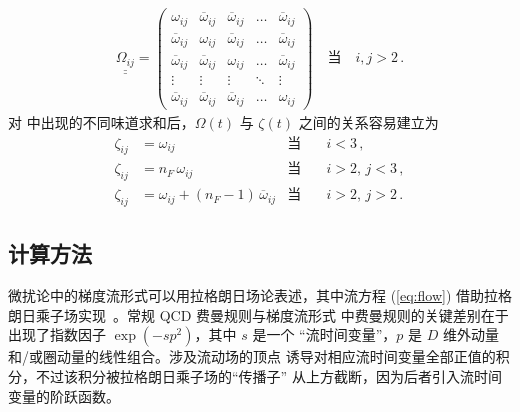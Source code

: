 \begin{equation}
	\begin{split}
		\underline{\underline{\Omega_{i j}}} =
		\begin{pmatrix}
			\omega_{i j} & \overline{\omega}_{i j} &
                        \overline{\omega}_{i j} & \dots &
                        \overline{\omega}_{i j} \\
			\overline{\omega}_{i j} & \omega_{i j} &
                        \overline{\omega}_{i j} & \dots &
                        \overline{\omega}_{i j} \\
			\overline{\omega}_{i j} & \overline{\omega}_{i j}
                        & \omega_{i j} & \dots & \overline{\omega}_{i j}
                        \\
			\vdots & \vdots & \vdots & \ddots & \vdots \\
			\overline{\omega}_{i j} & \overline{\omega}_{i
                          j} & \overline{\omega}_{i j} & \dots &
                        \omega_{i j}
		\end{pmatrix} \quad \text{当} \quad i,j > 2\, .
	\end{split}
\end{equation}
对  中出现的不同味道求和后，$\Omega (t)$ 与 $\zeta (t)$
之间的关系容易建立为
\begin{align}
	\zeta_{i j} &= \omega_{i j} & \text{当} &\quad i < 3 \, , \\
	\zeta_{i j} &= n_F \, \omega_{i j} & \text{当} &\quad i > 2, \, j < 3 \, , \\
	\zeta_{i j} &= \omega_{i j} + (n_F - 1) \, \overline{\omega}_{i j} & \text{当} &\quad i > 2, \, j > 2 \, .
\end{align}

\subsection{计算方法}

微扰论中的梯度流形式可以用拉格朗日场论表述，其中流方程 (\ref{eq:flow})
借助拉格朗日乘子场实现~\cite{Luscher:2011bx}。常规 QCD 费曼规则与梯度流形式
中费曼规则的关键差别在于出现了指数因子 $\exp(-sp^2)$，其中 $s$ 是一个
``流时间变量''，$p$ 是 $D$ 维外动量和/或圈动量的线性组合。涉及流动场的顶点
诱导对相应流时间变量全部正值的积分，不过该积分被拉格朗日乘子场的``传播子''
从上方截断，因为后者引入流时间变量的阶跃函数。

